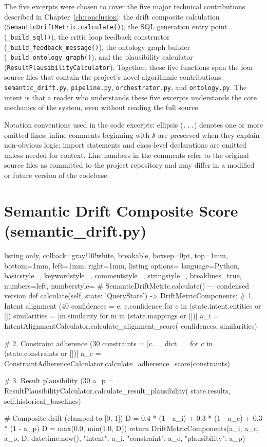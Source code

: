 \documentclass[12pt,a4paper]{report}
\begin{document}
The five excerpts were chosen to cover the five major technical contributions described in Chapter~\ref{ch:conclusion}: the drift composite calculation (\texttt{SemanticDriftMetric.calculate()}), the SQL generation entry point (\texttt{\_build\_sql()}), the critic loop feedback constructor (\texttt{\_build\_feedback\_message()}), the ontology graph builder (\texttt{\_build\_ontology\_graph()}), and the plausibility calculator (\texttt{ResultPlausibilityCalculator}). Together, these five functions span the four source files that contain the project's novel algorithmic contributions: \texttt{semantic\_drift.py}, \texttt{pipeline.py}, \texttt{orchestrator.py}, and \texttt{ontology.py}. The intent is that a reader who understands these five excerpts understands the core mechanics of the system, even without reading the full source.

Notation conventions used in the code excerpts: ellipsis (\texttt{...}) denotes one or more omitted lines; inline comments beginning with \texttt{\#} are preserved when they explain non-obvious logic; import statements and class-level declarations are omitted unless needed for context. Line numbers in the comments refer to the original source files as committed to the project repository and may differ in a modified or future version of the codebase.

\section{Semantic Drift Composite Score (semantic\_drift.py)}

\begin{tcblisting}{listing only, colback=gray!10!white, breakable, boxsep=0pt,
  top=1mm, bottom=1mm, left=1mm, right=1mm,
  listing options={
    language=Python, basicstyle=\small\ttfamily,
    keywordstyle=\color{kwcolor}, commentstyle=\color{cmtcolor},
    stringstyle=\color{strcolor}, breaklines=true,
    numbers=left, numberstyle=\tiny\color{gray}}}
# SemanticDriftMetric.calculate() — condensed version
def calculate(self, state: 'QueryState') -> DriftMetricComponents:
    # 1. Intent alignment (40 %
    confidences = {e: e.confidence for e in (state.intent.entities or [])}
    similarities = [m.similarity for m in (state.mappings or [])]
    a_i = IntentAlignmentCalculator.calculate_alignment_score(
        confidences, similarities)

    # 2. Constraint adherence (30 %
    constraints = [c.__dict__ for c in (state.constraints or [])]
    a_c = ConstraintAdherenceCalculator.calculate_adherence_score(constraints)

    # 3. Result plausibility (30 %
    a_p = ResultPlausibilityCalculator.calculate_result_plausibility(
        state.results, self.historical_baselines)

    # Composite drift (clamped to [0, 1])
    D = 0.4 * (1 - a_i) + 0.3 * (1 - a_c) + 0.3 * (1 - a_p)
    D = max(0.0, min(1.0, D))
    return DriftMetricComponents(a_i, a_c, a_p, D, datetime.now(),
        {"intent": a_i, "constraint": a_c, "plausibility": a_p})
\end{tcblisting}
\end{document}
